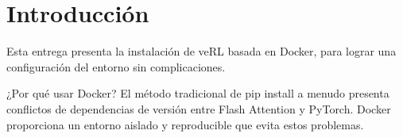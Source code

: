 \section{Introducción}
Esta entrega presenta la instalación de veRL basada en Docker, para lograr una configuración del entorno sin complicaciones.

\begin{knowledgebox}{¿Por qué usar Docker?}
El método tradicional de pip install a menudo presenta conflictos de dependencias de versión entre Flash Attention y PyTorch. Docker proporciona un entorno aislado y reproducible que evita estos problemas.
\end{knowledgebox}

